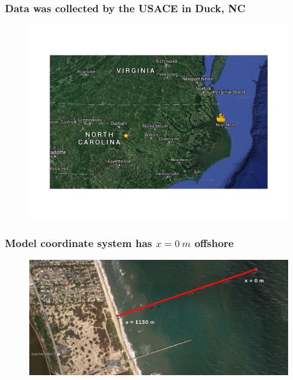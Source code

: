 \documentclass[7pt]{beamer}
\begin{document}
\begin{frame}
	\frametitle{Data was collected by the  USACE in Duck, NC}
		 \centering
		 \begin{figure}
       			 \includegraphics[width=1\linewidth]{img/map_ncsu_duck.png}
       		 \end{figure}
\end{frame}

\begin{frame}
	\frametitle{Model coordinate system has $x = 0~m$ offshore}
		\begin{figure}[H]
			\centering
			\includegraphics[width=1\linewidth]{img/Transect.png}
		\end{figure}
\end{frame}
\end{document}
